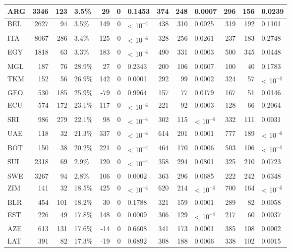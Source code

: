 \begin{tabular}{l|r|r|l|r|r|l|r|r|l|r|r|l}
\hline
ARG & 3346 & 123 & 3.5\% & 29 & 0 & 0.1453 & 374 & 248 & 0.0007 & 296 & 156 & 0.0239\\
\hline
BEL & 2627 & 94 & 3.5\% & 149 & 0 & < 10\textsuperscript{--4} & 438 & 310 & 0.0025 & 319 & 192 & 0.1101\\
\hline
ITA & 8067 & 286 & 3.4\% & 125 & 0 & < 10\textsuperscript{--4} & 328 & 256 & 0.0261 & 237 & 183 & 0.2748\\
\hline
EGY & 1818 & 63 & 3.3\% & 183 & 0 & < 10\textsuperscript{--4} & 490 & 331 & 0.0003 & 500 & 345 & 0.0448\\
\hline
MGL & 187 & 76 & 28.9\% & 27 & 0 & 0.2343 & 200 & 106 & 0.0607 & 100 & 40 & 0.1783\\
\hline
TKM & 152 & 56 & 26.9\% & 142 & 0 & 0.0001 & 292 & 99 & 0.0002 & 324 & 57 & < 10\textsuperscript{--4}\\
\hline
GEO & 530 & 185 & 25.9\% & -79 & 0 & 0.9964 & 157 & 77 & 0.0179 & 167 & 51 & 0.0146\\
\hline
ECU & 574 & 172 & 23.1\% & 117 & 0 & < 10\textsuperscript{--4} & 221 & 92 & 0.0003 & 128 & 66 & 0.2064\\
\hline
SRI & 986 & 279 & 22.1\% & 98 & 0 & < 10\textsuperscript{--4} & 302 & 115 & < 10\textsuperscript{--4} & 332 & 111 & 0.0031\\
\hline
UAE & 118 & 32 & 21.3\% & 337 & 0 & < 10\textsuperscript{--4} & 614 & 201 & 0.0001 & 777 & 189 & < 10\textsuperscript{--4}\\
\hline
BOT & 150 & 38 & 20.2\% & 221 & 0 & < 10\textsuperscript{--4} & 464 & 170 & 0.0006 & 503 & 106 & < 10\textsuperscript{--4}\\
\hline
SUI & 2318 & 69 & 2.9\% & 120 & 0 & < 10\textsuperscript{--4} & 358 & 294 & 0.0801 & 325 & 210 & 0.0723\\
\hline
SWE & 3267 & 94 & 2.8\% & 106 & 0 & 0.0002 & 363 & 296 & 0.0685 & 222 & 242 & 0.6348\\
\hline
ZIM & 141 & 32 & 18.5\% & 425 & 0 & < 10\textsuperscript{--4} & 620 & 214 & < 10\textsuperscript{--4} & 700 & 164 & < 10\textsuperscript{--4}\\
\hline
BLR & 454 & 101 & 18.2\% & 30 & 0 & 0.1788 & 321 & 159 & 0.0001 & 289 & 82 & 0.0058\\
\hline
EST & 226 & 49 & 17.8\% & 148 & 0 & 0.0009 & 306 & 129 & < 10\textsuperscript{--4} & 217 & 60 & 0.0037\\
\hline
AZE & 613 & 131 & 17.6\% & -14 & 0 & 0.6608 & 341 & 173 & 0.0001 & 385 & 108 & 0.0002\\
\hline
LAT & 391 & 82 & 17.3\% & -19 & 0 & 0.6892 & 308 & 188 & 0.0066 & 338 & 102 & 0.0015\\

\end{tabular}
